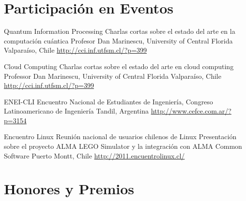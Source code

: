 \documentclass[11pt,a4paper]{moderncv}
\begin{document}
\section{Participación en Eventos}

        {Quantum Information Processing}
        {Charlas cortas sobre el estado del arte en la computación cuántica}
        {Profesor Dan Marinescu, University of Central Florida}
        {Valparaíso, Chile}
        {\url{http://cci.inf.utfsm.cl/?p=399}}

        {Cloud Computing}
        {Charlas cortas sobre el estado del arte en cloud computing}
        {Professor Dan Marinescu, University of Central Florida}
        {Valparaíso, Chile}
        {\url{http://cci.inf.utfsm.cl/?p=399}}

        {ENEI-CLI}
        {Encuentro Nacional de Estudiantes de Ingeniería, Congreso Latinoamericano de Ingeniería}{}
        {Tandil, Argentina}
        {\url{http://www.cefce.com.ar/?p=3154}}

        {Encuentro Linux}
        {Reunión nacional de usuarios chilenos de Linux}
        {Presentación sobre el proyecto ALMA LEGO Simulator y la integración con ALMA Common Software}
        {Puerto Montt, Chile}
        {\url{http://2011.encuentrolinux.cl/}}

\section{Honores y Premios}

\end{document}
